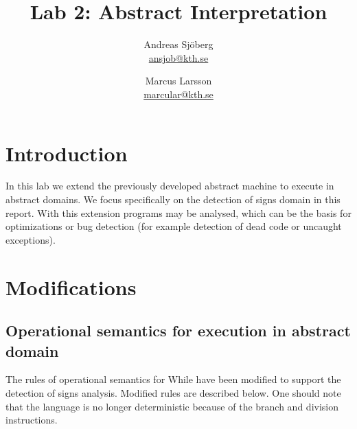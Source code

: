 \documentclass[a4paper,11pt]{article}
\title{Lab 2: Abstract Interpretation}
\author{Andreas Sjöberg \\ \url{ansjob@kth.se} 
		\and Marcus Larsson \\ \url{marcular@kth.se}
	}
\begin{document}
\thispagestyle{plain}
\maketitle
\clearpage

\tableofcontents
\clearpage

\section{Introduction}
In this lab we extend the previously developed abstract machine to execute in abstract domains.
We focus specifically on the detection of signs domain in this report.
With this extension programs may be analysed, which can be the basis for optimizations or bug detection (for example detection of dead code or uncaught exceptions).

\section{Modifications}

\subsection{Operational semantics for execution in abstract domain}
The rules of operational semantics for While have been modified to support the detection of signs analysis.
Modified rules are described below.
One should note that the language is no longer deterministic because of the branch and division instructions.
\end{document}
